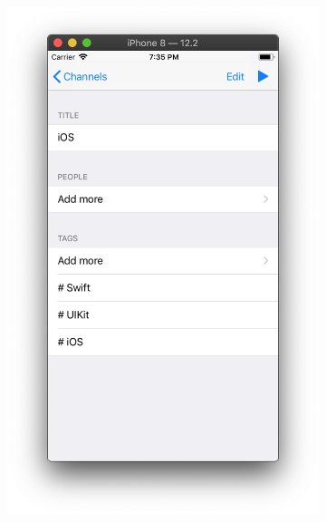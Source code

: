 \documentclass[a4paper,12pt]{article}
\begin{document}
\begin{figure}[h!]
\begin{subfigure}[b]{0.3\linewidth}
		\includegraphics[width=\linewidth]{../includes/pmi/ios_channel_what.png}
	\end{subfigure}
	\begin{subfigure}[b]{0.3\linewidth}

\end{subfigure}
\end{figure}
\end{document}
